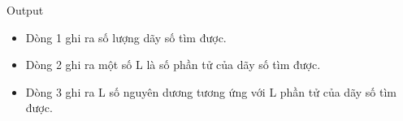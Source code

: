 Output
\begin{itemize}
	\item     Dòng 1 ghi ra số lượng dãy số tìm được.   
	\item     Dòng 2 ghi ra một số L là số phần tử của dãy số tìm được.   
	\item     Dòng 3 ghi ra L số nguyên dương tương ứng với L phần tử của dãy số tìm được.   
\end{itemize}
